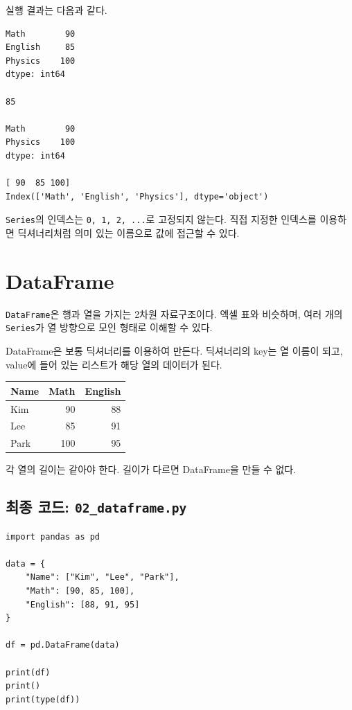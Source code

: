 \documentclass[11pt,a4paper]{article}
\begin{document}
실행 결과는 다음과 같다.

\begin{verbatim}
Math        90
English     85
Physics    100
dtype: int64

85

Math        90
Physics    100
dtype: int64

[ 90  85 100]
Index(['Math', 'English', 'Physics'], dtype='object')
\end{verbatim}

\begin{importantbox}
\texttt{Series}의 인덱스는 \texttt{0, 1, 2, ...}로 고정되지 않는다. 직접 지정한 인덱스를 이용하면 딕셔너리처럼 의미 있는 이름으로 값에 접근할 수 있다.
\end{importantbox}

\section{DataFrame}

\texttt{DataFrame}은 행과 열을 가지는 2차원 자료구조이다. 엑셀 표와 비슷하며, 여러 개의 \texttt{Series}가 열 방향으로 모인 형태로 이해할 수 있다.

DataFrame은 보통 딕셔너리를 이용하여 만든다. 딕셔너리의 key는 열 이름이 되고, value에 들어 있는 리스트가 해당 열의 데이터가 된다.

\begin{center}
\begin{tabular}{lrr}
\toprule
Name & Math & English \\
\midrule
Kim & 90 & 88 \\
Lee & 85 & 91 \\
Park & 100 & 95 \\
\bottomrule
\end{tabular}
\end{center}

각 열의 길이는 같아야 한다. 길이가 다르면 DataFrame을 만들 수 없다.

\subsection{최종 코드: \texttt{02\_dataframe.py}}

\begin{lstlisting}
import pandas as pd

data = {
    "Name": ["Kim", "Lee", "Park"],
    "Math": [90, 85, 100],
    "English": [88, 91, 95]
}

df = pd.DataFrame(data)

print(df)
print()
print(type(df))
\end{lstlisting}
\end{document}
